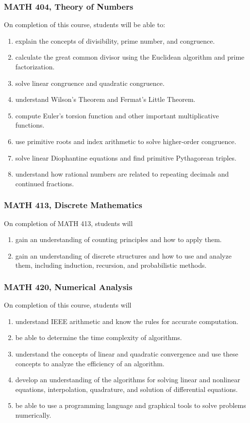 \documentclass[11pt]{article}
\newenvironment{alphalist}{
\begin{enumerate}[label=(\arabic*),widest=107 ,leftmargin=25pt, itemsep=0pt]}
{\end{enumerate}}
\begin{document}
\subsubsection*{MATH 404, Theory of Numbers}

On completion of this course, students will be able to:
\begin{alphalist}
    \item explain the concepts of divisibility, prime number, and congruence. 
    \item calculate the great common divisor using the Euclidean algorithm and prime factorization.
    \item solve linear congruence and quadratic congruence.
    \item understand Wilson's Theorem and Fermat's Little Theorem. 
    \item compute Euler's torsion function and other important multiplicative functions.
    \item use primitive roots and index arithmetic to solve higher-order congruence.  
    \item solve linear Diophantine equations and find primitive Pythagorean triples.
    \item understand how rational numbers are related to repeating decimals and continued fractions.
\end{alphalist}

\subsubsection*{MATH 413, Discrete Mathematics}

On completion of MATH 413, students will 
\begin{alphalist}
    \item gain an understanding of counting principles and how to apply them.
    \item gain an understanding of discrete structures and how to use and analyze them, including induction, recursion, and probabilistic methods.
\end{alphalist}

\subsubsection*{MATH 420, Numerical Analysis}

On completion of this course, students will
\begin{alphalist}
    \item understand IEEE arithmetic and know the rules for accurate computation.
    \item be able to determine the time complexity of algorithms.
    \item understand the concepts of linear and quadratic convergence and use these concepts to analyze the efficiency of an algorithm.
    \item develop an understanding of the algorithms for solving linear and nonlinear equations, interpolation, 
       quadrature, and solution of differential equations.
    \item be able to use a programming language and graphical tools to solve problems numerically.
\end{alphalist}
\end{document}
